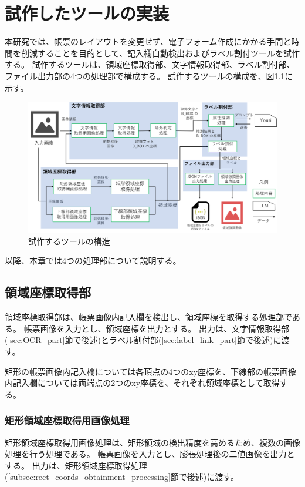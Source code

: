 \chapter{試作したツールの実装}\label{cha:Implementation}
本研究では、帳票のレイアウトを変更せず、電子フォーム作成にかかる手間と時間を削減することを目的として、記入欄自動検出およびラベル割付ツールを試作する。
試作するツールは、領域座標取得部、文字情報取得部、ラベル割付部、ファイル出力部の4つの処理部で構成する。
試作するツールの構成を、図\ref{fig:structure}に示す。

\begin{figure}[tp]
    \begin{center}
        \includegraphics[width=15cm]{image/04-implementation/structure.png}
        \caption{試作するツールの構造}
        \label{fig:structure}
    \end{center}
\end{figure}

以降、本章では4つの処理部について説明する。


\section{領域座標取得部}\label{sec:area_coords_obtainment_part}
領域座標取得部は、帳票画像内記入欄を検出し、領域座標を取得する処理部である。
帳票画像を入力とし、領域座標を出力とする。
出力は、文字情報取得部(\ref{sec:OCR_part}節で後述)とラベル割付部(\ref{sec:label_link_part}節で後述)に渡す。

矩形の帳票画像内記入欄については各頂点の4つのxy座標を、下線部の帳票画像内記入欄については両端点の2つのxy座標を、それぞれ領域座標として取得する。

\subsection{矩形領域座標取得用画像処理}\label{subsec:image_processing_for_rect_coords_obtainment}
矩形領域座標取得用画像処理は、矩形領域の検出精度を高めるため、複数の画像処理を行う処理である。
帳票画像を入力とし、膨張処理後の二値画像を出力とする。
出力は、矩形領域座標取得処理(\ref{subsec:rect_coords_obtainment_processing}節で後述)に渡す。

